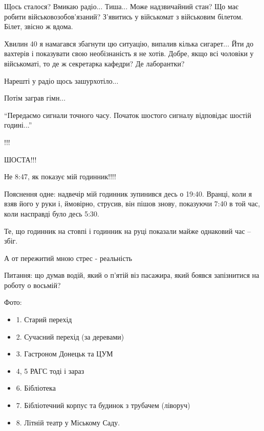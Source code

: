 \obeycr
Щось сталося?
Вмикаю радіо...
Тиша...
Може надзвичайний стан?
Що має робити військовозобов'язаний?
З'явитись у військомат з військовим білетом. 
Білет, звісно ж вдома.
\restorecr

Хвилин 40 я намагався збагнути цю ситуацію, випалив кілька сигарет... Йти до
вахтерів і показувати свою необізнаність я не хотів. Добре, якщо всі
чоловіки у військоматі, то де ж секретарка кафедри? Де лаборантки?

Нарешті у радіо щось зашурхотіло...

Потім заграв гімн...

\enquote{Передаємо сигнали точного часу. Початок шостого сигналу відповідає шостій годині...}

!!!

ШОСТА!!!

Не 8:47, як показує мій годинник!!!!

Пояснення одне: надвечір мій годинник зупинився десь о 19:40. Вранці, коли я
взяв його у руки і, ймовірно, струсив, він пішов знову, показуючи 7:40 в той
час, коли насправді було десь 5:30. 

Те, що годинник на стовпі і годинник на руці показали майже однаковий час – збіг.

А от пережитий мною стрес - реальність

Питання: що думав водій, який о п'ятій віз пасажира, який боявся запізнитися на роботу о восьмій?

Фото:

\begin{itemize}
  \item 1. Старий перехід
  \item 2. Сучасний перехід (за деревами)
  \item 3. Гастроном Донецьк та ЦУМ
  \item 4, 5 РАГС тоді і зараз
  \item 6. Бібліотека
  \item 7. Бібліотечний корпус та будинок з трубачем (ліворуч)
  \item 8. Літній театр у Міському Саду.
\end{itemize}
